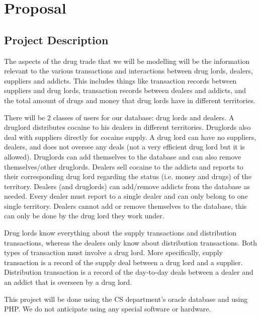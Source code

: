 \documentclass[11pt, oneside]{article}   	%
\theoremstyle{definition}
\theoremstyle{remark}
\begin{document}
\thispagestyle{empty}   %





\cleardoublepage
\setcounter{page}{1}    %

\section{Proposal}
\subsection{Project Description}
The aspects of the drug trade that we will be modelling will be the information relevant to the various transactions and interactions between drug lords, dealers, suppliers and addicts. This includes things like transaction records between suppliers and drug lords, transaction records between dealers and addicts, and the total amount of drugs and money that drug lords have in different territories.

There will be 2 classes of users for our database: drug lords and dealers. A druglord distributes cocaine to his dealers in different territories. Druglords also deal with suppliers directly for cocaine supply. A drug lord can have no suppliers, dealers, and does not oversee any deals (not a very efficient drug lord but it is allowed). Druglords can add themselves to the database and can also remove themselves/other druglords. Dealers sell cocaine to the addicts and reports to their corresponding drug lord regarding the status (i.e. money and drugs) of the territory. Dealers (and druglords) can add/remove addicts from the database as needed.  Every dealer must report to a single dealer and can only belong to one single territory. Dealers cannot add or remove themselves to the database, this can only be done by the drug lord they work under.

Drug lords know everything about the supply transactions and distribution transactions, whereas the dealers only know about distribution transactions. Both types of transaction must involve a drug lord. More specifically, supply transaction is a record of the supply deal between a drug lord and a supplier. Distribution transaction is a record of the day-to-day deals between a dealer and an addict that is overseen by a drug lord. 

This project will be done using the CS department's oracle database and using PHP. We do not anticipate using any special software or hardware.
\end{document}
